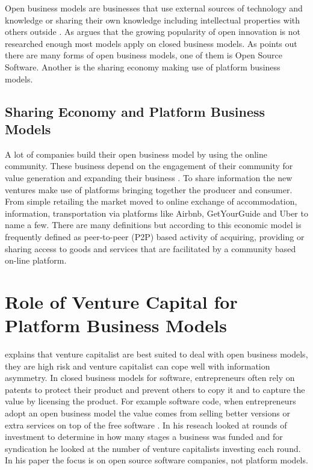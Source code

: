 \documentclass[a4paper, 11pt]{article}
\begin{document}
Open business models are businesses that use external sources of technology and knowledge or sharing their own knowledge including intellectual properties with others outside \citep{chesbrough2007companies}.
As \cite{colombo2016open} argues that the growing popularity of open innovation is not researched enough most models apply on closed business models. As \cite{colombo2016open} points out there are many forms of open business models, one of them is Open Source Software. Another is the sharing economy making use of platform business models.


\subsection{Sharing Economy and Platform Business Models}
A lot of companies build their open business model by using the online community. These business depend on the engagement of their community for value generation and expanding their business \citep{colombo2016open}. To share information the new ventures make use of platforms bringing together the producer and consumer. From simple retailing the market moved to online exchange of accommodation, information, transportation via platforms like Airbnb, GetYourGuide and Uber to name a few. There are many definitions but according to \cite{investopia} this economic model is frequently defined as peer-to-peer (P2P) based activity of acquiring, providing or sharing access to goods and services that are facilitated by a community based on-line platform.



\section{Role of Venture Capital for Platform Business Models}

\cite{colombo2016open} explains that venture capitalist are best suited to deal with open business models, they are high risk and venture capitalist can cope well with information asymmetry. In closed business models for software, entrepreneurs often rely on patents to protect their product and prevent others to copy it and to capture the value by licensing the product. For example software code, when entrepreneurs adopt an open business model the value comes from selling better versions or extra services on top of the free software \citep{colombo2016open}. In his reseach \cite{colombo2016open} looked at rounds of investment to determine in how many stages a business was funded and for syndication he looked at the number of venture capitalists investing each round. In his paper the focus is on open source software companies, not platform models.
\end{document}

